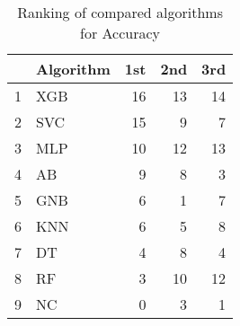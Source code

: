 \begin{table}
\footnotesize
\caption{Ranking of compared algorithms for Accuracy}
\label{tab:places Accuracy}
\begin{tabular}{llrrr}
\hline
 & Algorithm & 1st & 2nd & 3rd \\
\hline
1 & XGB & 16 & 13 & 14 \\
2 & SVC & 15 & 9 & 7 \\
3 & MLP & 10 & 12 & 13 \\
4 & AB & 9 & 8 & 3 \\
5 & GNB & 6 & 1 & 7 \\
6 & KNN & 6 & 5 & 8 \\
7 & DT & 4 & 8 & 4 \\
8 & RF & 3 & 10 & 12 \\
9 & NC & 0 & 3 & 1 \\
\hline
\end{tabular}
\end{table}
